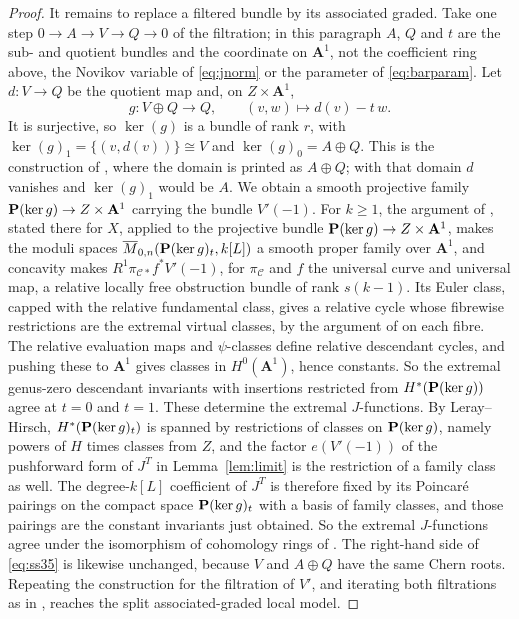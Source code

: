 \begin{proof}
  It remains to replace a filtered bundle by its associated graded.  Take one
  step \(0\to A\to V\to Q\to0\) of the filtration; in this paragraph \(A\),
  \(Q\) and \(t\) are the sub- and quotient bundles and the coordinate on
  \(\mathbf A^{1}\), not the coefficient ring above, the Novikov variable of
  \eqref{eq:jnorm} or the parameter of \eqref{eq:barparam}.  Let
  \(d\colon V\to Q\) be the quotient map and, on \(Z\times\mathbf A^{1}\),
  \[
    g\colon V\oplus Q\to Q,\qquad (v,w)\mapsto d(v)-t\,w .
  \]
  It is surjective, so \(\ker(g)\) is a bundle of rank \(r\), with
  \(\ker(g)_{1}=\{(v,d(v))\}\cong V\) and \(\ker(g)_{0}=A\oplus Q\).  This
  is the construction of \cite[Lemma~9.4]{SS}, where the domain is printed as
  \(A\oplus Q\); with that domain \(d\) vanishes and \(\ker(g)_{1}\) would be
  \(A\).  We obtain a smooth projective family
  \(\mathbf P(\ker g)\to Z\times\mathbf A^{1}\) carrying the bundle \(V'(-1)\).
  For \(k\ge1\), the argument of
  \cite[Proposition~3.1]{SS}, stated there for \(X\), applied to the projective bundle
  \(\mathbf P(\ker g)\to Z\times\mathbf A^{1}\), makes the moduli spaces
  \(\overline M_{0,n}(\mathbf P(\ker g)_{t},k[L])\) a smooth proper family
  over \(\mathbf A^{1}\), and concavity makes
  \(R^{1}\pi_{\mathcal C*}f^{*}V'(-1)\), for \(\pi_{\mathcal C}\) and \(f\)
  the universal curve and universal map, a relative locally free obstruction
  bundle of rank \(s(k-1)\).  Its Euler class, capped with the relative
  fundamental class, gives a relative cycle whose fibrewise restrictions
  are the extremal virtual classes, by the argument of
  \cite[Corollary~3.2]{SS} on each fibre.  The relative
  evaluation maps and \(\psi\)-classes define relative descendant cycles, and
  pushing these to \(\mathbf A^{1}\) gives classes in
  \(H^{0}(\mathbf A^{1})\), hence constants.  So the extremal genus-zero
  descendant invariants with insertions restricted from
  \(H^{*}(\mathbf P(\ker g))\) agree at \(t=0\) and \(t=1\).  These determine the
  extremal \(J\)-functions.  By Leray--Hirsch, \(H^{*}(\mathbf P(\ker g)_{t})\) is
  spanned by restrictions of classes on \(\mathbf P(\ker g)\), namely powers of
  \(H\) times classes from \(Z\), and the factor \(e(V'(-1))\) of the
  pushforward form of \(J^{T}\) in Lemma~\ref{lem:limit} is the restriction
  of a family class as well.  The degree-\(k[L]\) coefficient of \(J^{T}\) is
  therefore fixed by its Poincar\'e pairings on the compact space
  \(\mathbf P(\ker g)_{t}\) with a basis of family classes, and those pairings are
  the constant invariants just obtained.  So the extremal \(J\)-functions
  agree under the isomorphism of cohomology rings of \cite[Lemma~9.4]{SS}.  The right-hand side of \eqref{eq:ss35} is likewise
  unchanged, because \(V\) and \(A\oplus Q\) have the same Chern roots.
  Repeating the construction for the filtration of \(V'\), and iterating both
  filtrations as in \cite[Lemma~9.6]{SS}, reaches the split
  associated-graded local model.
\end{proof}

